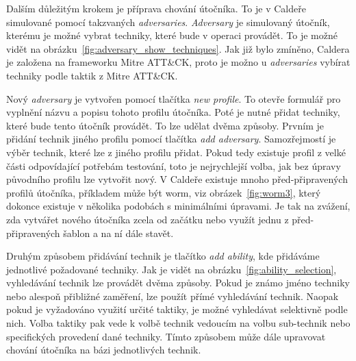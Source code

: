 
Dalším důležitým krokem je příprava chování útočníka.
To je v Caldeře simulované pomocí takzvaných \textit{adversaries}.
\textit{Adversary} je simulovaný útočník, kterému je možné vybrat techniky, které bude v operaci provádět.
To je možné vidět na obrázku~\ref{fig:adversary_show_techniques}.
Jak již bylo zmíněno, Caldera je založena na frameworku Mitre ATT\&CK, proto je možno u \textit{adversaries} vybírat techniky podle taktik z Mitre ATT\&CK\@.


\noindent %
Nový \textit{adversary} je vytvořen pomocí tlačítka \textit{new profile}.
To otevře formulář pro vyplnění názvu a popisu tohoto profilu útočníka.
Poté je nutné přidat techniky, které bude tento útočník provádět.
To lze udělat dvěma způsoby.
Prvním je přidání technik jiného profilu pomocí tlačítka \textit{add adversary}.
Samozřejmostí je výběr technik, které lze z jiného profilu přidat.
Pokud tedy existuje profil z velké části odpovídající potřebám testování, toto je nejrychlejší volba, jak bez úpravy původního profilu lze vytvořit nový.
V Caldeře existuje mnoho před-připravených profilů útočníka, příkladem může být worm, viz obrázek~\ref{fig:worm3}, který dokonce existuje v několika podobách s minimálními úpravami.
Je tak na zvážení, zda vytvářet nového útočníka zcela od začátku nebo využít jednu z před-připravených šablon a na ní dále stavět.


Druhým způsobem přidávání technik je tlačítko \textit{add ability}, kde přidáváme jednotlivé požadované techniky.
Jak je vidět na obrázku~\ref{fig:ability_selection}, vyhledávání technik lze provádět dvěma způsoby.
Pokud je známo jméno techniky nebo alespoň přibližné zaměření, lze použít přímé vyhledávání technik.
Naopak pokud je vyžadováno využití určité taktiky, je možné vyhledávat selektivně podle nich.
Volba taktiky pak vede k volbě technik vedoucím na volbu sub-technik nebo specifických provedení dané techniky.
Tímto způsobem může dále upravovat chování útočníka na bázi jednotlivých technik.

